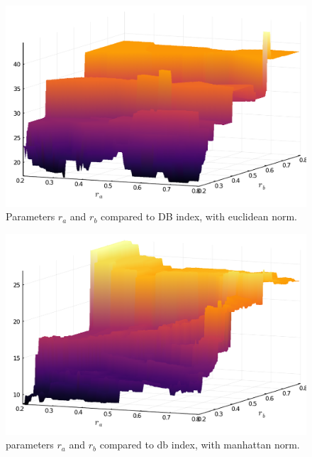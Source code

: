\documentclass[conference]{IEEEtran}
\theoremstyle{definition}
\theoremstyle{remark}
\theoremstyle{remark}
\begin{document}
\begin{figure}[t]
  \centering
  \includegraphics[scale=.35]{figs/iris/exploring-3d}
  \caption{Parameters $r_{a}$ and $r_{b}$ compared to DB index, with euclidean
    norm.}
  \label{fig:exp3d}
\end{figure}

\begin{figure}[t]
  \centering
  \includegraphics[scale=.35]{figs/iris/exploring-3d-man}
  \caption{parameters $r_{a}$ and $r_{b}$ compared to db index, with manhattan
    norm.}
  \label{fig:exp3dman}
\end{figure}
\end{document}
